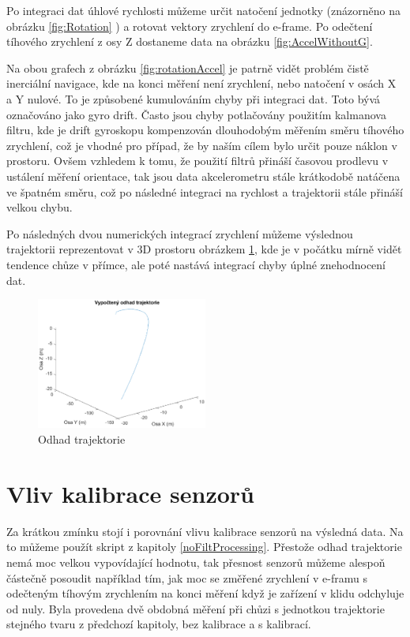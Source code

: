 Po integraci dat úhlové rychlosti můžeme určit natočení jednotky (znázorněno na obrázku \ref{fig:Rotation} ) a rotovat vektory zrychlení do e-frame. Po odečtení tíhového zrychlení z osy Z dostaneme data na obrázku \ref{fig:AccelWithoutG}.

Na obou grafech z obrázku \ref{fig:rotationAccel} je patrně vidět problém čistě inerciální navigace, kde na konci měření není zrychlení, nebo natočení v osách X a Y nulové. To je způsobené kumulováním chyby při integraci dat. Toto bývá označováno jako gyro drift. Často jsou chyby potlačovány použitím kalmanova filtru, kde je drift gyroskopu kompenzován dlouhodobým měřením směru tíhového zrychlení, což je vhodné pro případ, že by naším cílem bylo určit pouze náklon v prostoru. Ovšem vzhledem k tomu, že použití filtrů přináší časovou prodlevu v ustálení měření orientace, tak jsou data akcelerometru stále krátkodobě natáčena ve špatném směru, což po následné integraci na rychlost a trajektorii stále přináší velkou chybu.

Po následných dvou numerických integrací zrychlení můžeme výslednou trajektorii reprezentovat v 3D prostoru obrázkem \ref{fig:Trajectory}, kde je v počátku mírně vidět tendence chůze v přímce, ale poté nastává integrací chyby úplné znehodnocení dat. 

\begin{figure}[h]
     \centering
         \includegraphics[width=0.5\textwidth]{obrazky/matlab/1measTraj}
         \caption{Odhad trajektorie}
        \label{fig:Trajectory}
\end{figure}

\section{Vliv kalibrace senzorů}
Za krátkou zmínku stojí i porovnání vlivu kalibrace senzorů na výsledná data. Na to můžeme použít skript z kapitoly \ref{noFiltProcessing}. Přestože odhad trajektorie nemá moc velkou vypovídající hodnotu, tak přesnost senzorů můžeme alespoň částečně posoudit například tím, jak moc se změřené zrychlení v e-framu s odečteným tíhovým zrychlením na konci měření když je zařízení v klidu odchyluje od nuly. Byla provedena dvě obdobná měření při chůzi s jednotkou trajektorie stejného tvaru z předchozí kapitoly, bez kalibrace a s kalibrací.

